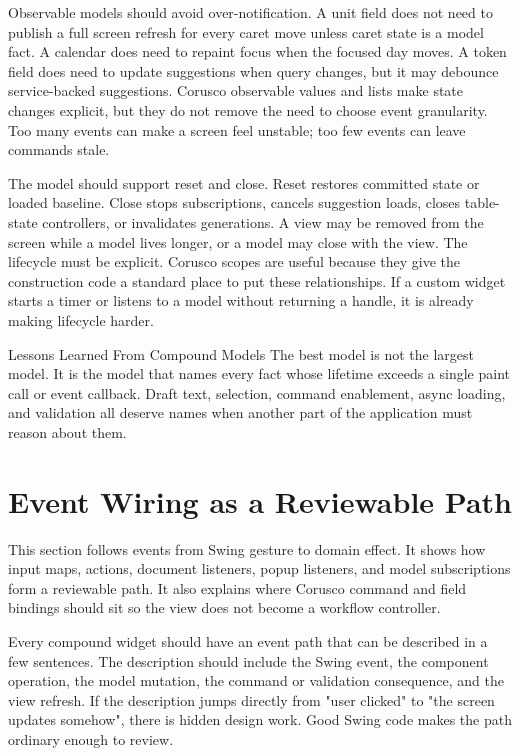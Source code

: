 Observable models should avoid over-notification. A unit field does not need
to publish a full screen refresh for every caret move unless caret state is a
model fact. A calendar does need to repaint focus when the focused day moves.
A token field does need to update suggestions when query changes, but it may
debounce service-backed suggestions. Corusco observable values and lists make
state changes explicit, but they do not remove the need to choose event
granularity. Too many events can make a screen feel unstable; too few events
can leave commands stale.

The model should support reset and close. Reset restores committed state or
loaded baseline. Close stops subscriptions, cancels suggestion loads, closes
table-state controllers, or invalidates generations. A view may be removed
from the screen while a model lives longer, or a model may close with the view.
The lifecycle must be explicit. Corusco scopes are useful because they give
the construction code a standard place to put these relationships. If a
custom widget starts a timer or listens to a model without returning a handle,
it is already making lifecycle harder.

\begin{principlebox}{Lessons Learned From Compound Models}
The best model is not the largest model. It is the model that names every fact
whose lifetime exceeds a single paint call or event callback. Draft text,
selection, command enablement, async loading, and validation all deserve names
when another part of the application must reason about them.
\end{principlebox}

\section{Event Wiring as a Reviewable Path}

\begin{roadmapbox}
This section follows events from Swing gesture to domain effect. It shows how
input maps, actions, document listeners, popup listeners, and model
subscriptions form a reviewable path. It also explains where Corusco command and
field bindings should sit so the view does not become a workflow controller.
\end{roadmapbox}

Every compound widget should have an event path that can be described in a
few sentences. The description should include the Swing event, the component
operation, the model mutation, the command or validation consequence, and the
view refresh. If the description jumps directly from "user clicked" to "the
screen updates somehow", there is hidden design work. Good Swing code makes
the path ordinary enough to review.

